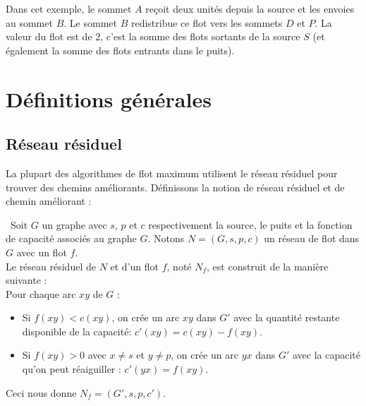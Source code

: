 \documentclass[a4paper]{article}
\begin{document}
Dans cet exemple, le sommet $A$ reçoit deux unités depuis la source et les envoies au sommet $B$. Le sommet $B$ redistribue ce flot vers les sommets $D$ et $P$. La valeur du flot est de $2$, c'est la somme des flots sortants de la source $S$ (et également la somme des flots entrants dans le puits). 

\section{Définitions générales}

\subsection{Réseau résiduel}
La plupart des algorithmes de flot maximum utilisent le réseau résiduel pour trouver des chemins améliorants. Définissons la notion de réseau résiduel et de chemin améliorant :
\begin{definition}\,
Soit $G$ un graphe avec $s$, $p$ et $c$ respectivement la source, le puits et la fonction de capacité associés au graphe $G$. Notons $N = (G,s,p,c)$ un réseau de flot dans $G$ avec un flot $f$.\\
Le réseau résiduel de $N$ et d'un flot $f$, noté $N_f$, est construit de la manière suivante :\\
Pour chaque arc $xy$ de $G$ :
\begin{itemize}
	\item
    Si $f(xy)<c(xy)$, on crée un arc $xy$ dans $G'$ avec la quantité restante disponible de la capacité: $c'(xy) = c(xy) - f(xy)$.
    \item 
    Si $f(xy)>0$ avec $x\ne s$ et $y\ne p$, on crée un arc $yx$ dans $G'$ avec la capacité qu'on peut réaiguiller : $c'(yx) = f(xy)$.
\end{itemize}
Ceci nous donne $N_f = (G',s,p,c')$.
\end{definition}
\end{document}
